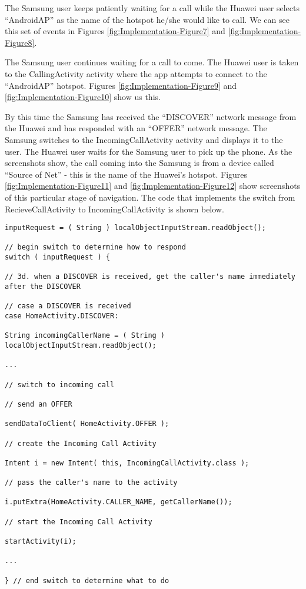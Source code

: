 \documentclass[12pt,svgnames,smaller]{article} %
\begin{document}
		The Samsung user keeps patiently waiting for a call while the Huawei user selects “AndroidAP” as the name of the hotspot he/she would like to call. We can see this set of events in Figures \ref{fig:Implementation-Figure7} and \ref{fig:Implementation-Figure8}.
		
		The Samsung user continues waiting for a call to come. The Huawei user is taken to the CallingActivity activity where the app attempts to connect to the “AndroidAP” hotspot. Figures \ref{fig:Implementation-Figure9} and \ref{fig:Implementation-Figure10} show us this.
		
		By this time the Samsung has received the “DISCOVER” network message from the Huawei and has responded with an “OFFER” network message. The Samsung switches to the IncomingCallActivity activity and displays it to the user. The Huawei user waits for the Samsung user to pick up the phone. As the screenshots show, the call coming into the Samsung is from a device called “Source of Net” - this is the name of the Huawei’s hotspot. Figures \ref{fig:Implementation-Figure11} and \ref{fig:Implementation-Figure12} show screenshots of this particular stage of navigation. The code that implements the switch from RecieveCallActivity to IncomingCallActivity is shown below.
		
		\begin{verbatim}
inputRequest = ( String ) localObjectInputStream.readObject();

// begin switch to determine how to respond
switch ( inputRequest ) {

// 3d. when a DISCOVER is received, get the caller's name immediately after the DISCOVER

// case a DISCOVER is received
case HomeActivity.DISCOVER:

String incomingCallerName = ( String ) localObjectInputStream.readObject();

...	                

// switch to incoming call

// send an OFFER

sendDataToClient( HomeActivity.OFFER );

// create the Incoming Call Activity

Intent i = new Intent( this, IncomingCallActivity.class );

// pass the caller's name to the activity

i.putExtra(HomeActivity.CALLER_NAME, getCallerName());

// start the Incoming Call Activity

startActivity(i);

...

} // end switch to determine what to do	                                
		\end{verbatim}
		
\end{document}
